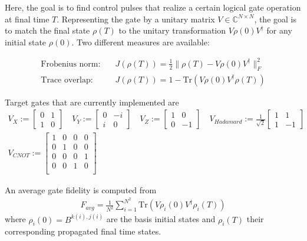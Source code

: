 \documentclass[11pt]{article}
\newcommand{\C}{\mathds{C}}
\begin{document}
Here, the goal is to find control pulses that realize a certain logical gate
operation at final time $T$. Representing the gate by a unitary matrix $V\in
\C^{N\times N}$, the goal is to match the final state $\rho(T)$ to the unitary
transformation $V\rho(0)V^{\dagger}$ for any initial state $\rho(0)$. Two different measures are available:

\begin{align}
 \text{Frobenius norm:} \quad & J(\rho(T)) = \frac{1}{2}\| \rho(T) - V\rho(0)V^{\dagger} \|^2_F  \\
 \text{Trace overlap:} \quad  & J(\rho(T)) = 1 - \mbox{Tr}\left(V\rho(0)V^{\dagger}\rho(T) \right) 
\end{align} 


Target gates that are currently implemented are
\begin{align}
  V_{X} := \begin{bmatrix} 0 & 1 \\ 1 & 0  \end{bmatrix} \quad
  V_{Y} := \begin{bmatrix} 0 & -i \\ i & 0 \end{bmatrix} \quad
  V_{Z} := \begin{bmatrix} 1 & 0 \\ 0 & -1 \end{bmatrix} \quad 
  V_{Hadamard} := \frac{1}{\sqrt{2}} 
           \begin{bmatrix} 1 & 1 \\ 1 & -1 \end{bmatrix} \\
  V_{CNOT} := \begin{bmatrix} 1  & 0 & 0 & 0 \\ 
                               0  & 1 & 0 & 0 \\ 
                               0  & 0 & 0 & 1 \\ 
                               0  & 0 & 1 & 0 \\ 
                \end{bmatrix}
\end{align}

An average gate fidelity is computed from 
\begin{align}
  F_{avg} = \frac{1}{N^2} \sum_{i=1}^{N^2} \mbox{Tr}\left(V\rho_i(0)V^{\dagger}\rho_i(T) \right) 
\end{align}
where $\rho_i(0) = B^{k(i), j(i)}$ are the basis initial states and $\rho_i(T)$ their corresponding propagated final time states.
\end{document}

